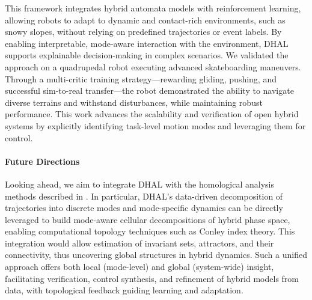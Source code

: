 \documentclass[letterpaper,11pt]{article}
\begin{document}
This framework integrates hybrid automata models with reinforcement learning, allowing robots to adapt to dynamic and contact-rich environments, such as snowy slopes, without relying on predefined trajectories or event labels.
By enabling interpretable, mode-aware interaction with the environment, DHAL supports explainable decision-making in complex scenarios.
We validated the approach on a quadrupedal robot executing advanced skateboarding maneuvers.
Through a multi-critic training strategy—rewarding gliding, pushing, and successful sim-to-real transfer—the robot demonstrated the ability to navigate diverse terrains and withstand disturbances, while maintaining robust performance.
This work advances the scalability and verification of open hybrid systems by explicitly identifying task-level motion modes and leveraging them for control.

\paragraph{Future Directions}

Looking ahead, we aim to integrate DHAL with the homological analysis methods described in .
In particular, DHAL’s data-driven decomposition of trajectories into discrete modes and mode-specific dynamics can be directly leveraged to build mode-aware cellular decompositions of hybrid phase space, enabling computational topology techniques such as Conley index theory.
This integration would allow estimation of invariant sets, attractors, and their connectivity, thus uncovering global structures in hybrid dynamics.
Such a unified approach offers both local (mode-level) and global (system-wide) insight, facilitating verification, control synthesis, and refinement of hybrid models from data, with topological feedback guiding learning and adaptation.
\end{document}
